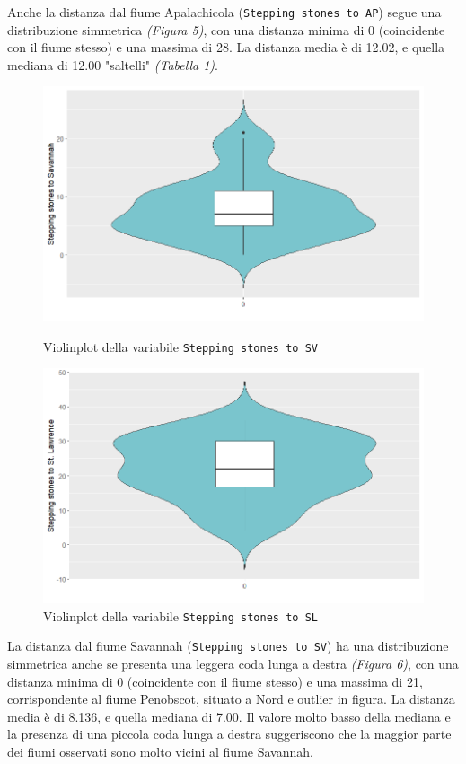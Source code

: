 \documentclass{article} %
\begin{document}
Anche la distanza dal fiume Apalachicola (\texttt{Stepping stones to AP}) segue una distribuzione simmetrica \textit{(Figura 5)}, con una distanza minima di 0 (coincidente con il fiume stesso) e una massima di 28. La distanza media è di 12.02, e quella mediana di 12.00 "saltelli" \textit{(Tabella 1)}.

\begin{figure}[H]
    \centering
    \begin{minipage}{0.49\textwidth}
        \centering
        \includegraphics[width=\textwidth]{immagini/vp_sv.png}
        \captionsetup{justification=centering}
        \caption{Violinplot della variabile \texttt{Stepping stones to SV}}
    \end{minipage}
    \hfill
    \begin{minipage}{0.49\textwidth}
        \centering
        \includegraphics[width=\textwidth]{immagini/vp_sl.png}
        \captionsetup{justification=centering}
        \caption{Violinplot della variabile \texttt{Stepping stones to SL}}
    \end{minipage}
\end{figure}
La distanza dal fiume Savannah (\texttt{Stepping stones to SV}) ha una distribuzione simmetrica anche se presenta una leggera coda lunga a destra \textit{(Figura 6)}, con una distanza minima di 0 (coincidente con il fiume stesso) e una massima di 21, corrispondente al fiume Penobscot, situato a Nord e outlier in figura. La distanza media è di 8.136, e quella mediana di 7.00. Il valore molto basso della mediana e la presenza di una piccola coda lunga a destra suggeriscono che la maggior parte dei fiumi osservati sono molto vicini al fiume Savannah.
\end{document}
